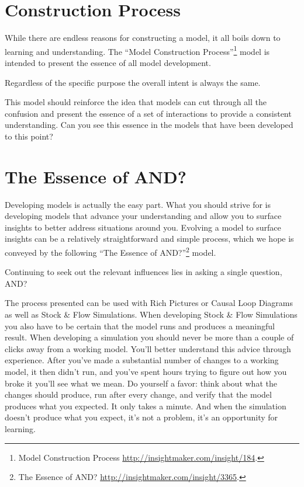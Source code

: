 \documentclass[]{memoir}
\begin{document}
\section{Construction Process}

While there are endless reasons for constructing a model, it all boils
down to learning and understanding. The ``Model Construction
Process''\footnote{Model Construction Process
  \url{http://insightmaker.com/insight/184}.} model is intended to
present the essence of all model development.

\FloatBarrier 

\begin{model}[frametitle={Model: Model Construction Process}] 

 Regardless of the specific purpose the overall intent is always the same.




 \end{model}

This model should reinforce the idea that models can cut through all the
confusion and present the essence of a set of interactions to provide a
consistent understanding. Can you see this essence in the models that
have been developed to this point?

\section{The Essence of AND?}

Developing models is actually the easy part. What you should strive for
is developing models that advance your understanding and allow you to
surface insights to better address situations around you. Evolving a
model to surface insights can be a relatively straightforward and simple
process, which we hope is conveyed by the following ``The Essence of
AND?''\footnote{The Essence of AND?
  \url{http://insightmaker.com/insight/3365}.} model.

\FloatBarrier 

\begin{model}[frametitle={Model: The Essence of AND?}] 

 Continuing to seek out the relevant influences lies in asking a single question, AND?




 \end{model}

The process presented can be used with Rich Pictures or Causal Loop
Diagrams as well as Stock \& Flow Simulations. When developing Stock \&
Flow Simulations you also have to be certain that the model runs and
produces a meaningful result. When developing a simulation you should
never be more than a couple of clicks away from a working model. You'll
better understand this advice through experience. After you've made a
substantial number of changes to a working model, it then didn't run,
and you've spent hours trying to figure out how you broke it you'll see
what we mean. Do yourself a favor: think about what the changes should
produce, run after every change, and verify that the model produces what
you expected. It only takes a minute. And when the simulation doesn't
produce what you expect, it's not a problem, it's an opportunity for
learning.
\end{document}
